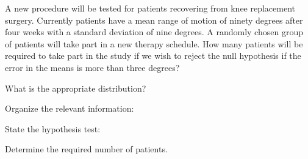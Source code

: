 \begin{problem}
\clearpage

\item A new procedure will be tested for patients recovering from knee
  replacement surgery. Currently patients have a mean range of motion
  of ninety degrees after four weeks with a standard deviation of nine
  degrees. A randomly chosen group of patients will take part in a new
  therapy schedule. How many patients will be required to take part in
  the study if we wish to reject the null hypothesis if the error in
  the means is more than three degrees?

  \begin{subproblem}
  \item What is the appropriate distribution? 
  \item Organize the relevant information: \\ [30pt]
  \item State the hypothesis test: \\ [20pt]
  \item Determine the required number of patients.
    \vfill
  \end{subproblem}




\end{problem}

